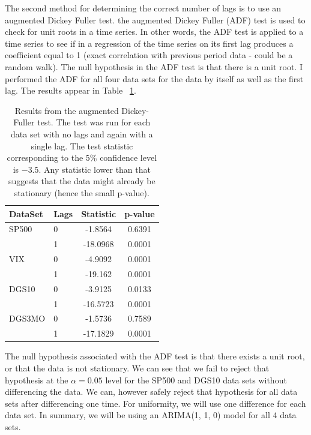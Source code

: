 \documentclass[a4paper, 11pt, twoside]{article}
\theoremstyle{definition} %
\numberwithin{equation}{section}
\begin{document}
      The second method for determining the correct number of lags is to use an augmented Dickey Fuller test.  the augmented Dickey Fuller (ADF) test is used to check for unit roots in a time series. In other words, the ADF test is applied to a time series to see if in a regression of the time series on its first lag produces a coefficient equal to 1 (exact correlation with previous period data - could be a random walk). The null hypothesis in the ADF test is that there is a unit root. I performed the ADF for all four data sets for the data by itself as well as the first lag. The results appear in Table ~\ref{tab:dickeyfuller}.

      \begin{table}
        \begin{centering}
          \begin{tabular}{|l|l|cc|}
          \hline
            \rowcolor{gray!45} DataSet & Lags &  Statistic & p-value\\
            \hline
            \hline
            \rowcolor{gray!7} SP500 & 0 & -1.8564 & 0.6391\\
           \rowcolor{gray!23} {} & 1  & -18.0968 & 0.0001\\
            \rowcolor{gray!7} VIX & 0 & -4.9092 & 0.0001\\
           \rowcolor{gray!23} {} & 1  & -19.162 & 0.0001\\
            \rowcolor{gray!7} DGS10 & 0 & -3.9125 & 0.0133\\
            \rowcolor{gray!23} {} & 1 & -16.5723 & 0.0001\\
            \rowcolor{gray!7} DGS3MO & 0 & -1.5736 & 0.7589\\
            \rowcolor{gray!23} {} & 1 & -17.1829 & 0.0001\\
          \bottomrule
          \end{tabular}
          \captionsetup{width=5.5in}
          \caption{Results from the augmented Dickey-Fuller test. The test was run for each data set with no lags and again with a single lag. The test statistic corresponding to the 5\% confidence level is $ -3.5$. Any statistic lower than that suggests that the data might already be stationary (hence the small p-value).}
          \label{tab:dickeyfuller}
        \end{centering}
      \end{table}

      The null hypothesis associated with the ADF test is that there exists a unit root, or that the data is not stationary. We can see that we fail to reject that hypothesis at the $\alpha = 0.05$ level for the SP500 and DGS10 data sets without differencing the data. We can, however safely reject that hypothesis for all data sets after differencing one time. For uniformity, we will use one difference for each data set.  In summary, we will be using an ARIMA(1, 1, 0) model for all 4 data sets.
\end{document}
